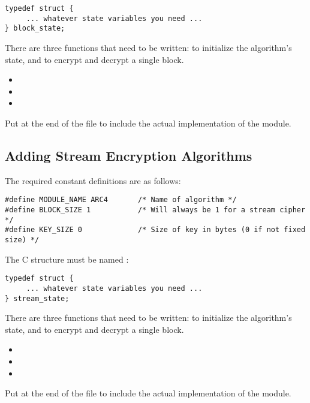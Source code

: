 \documentclass{howto}
\begin{document}
\begin{verbatim}
typedef struct {
     ... whatever state variables you need ...
} block_state;
\end{verbatim}

There are three functions that need to be written: to initialize the
algorithm's state, and to encrypt and decrypt a single block.

\begin{itemize}
  \item {}
  \item {}
  \item {}
\end{itemize}

Put  at the end of the file to
include the actual implementation of the module.


\subsection{Adding Stream Encryption Algorithms}

The required constant definitions are as follows:

\begin{verbatim}
#define MODULE_NAME ARC4       /* Name of algorithm */
#define BLOCK_SIZE 1           /* Will always be 1 for a stream cipher */
#define KEY_SIZE 0             /* Size of key in bytes (0 if not fixed size) */
\end{verbatim}

The C structure must be named :

\begin{verbatim}
typedef struct {
     ... whatever state variables you need ...
} stream_state;
\end{verbatim}

There are three functions that need to be written: to initialize the
algorithm's state, and to encrypt and decrypt a single block.

\begin{itemize}
  \item {}
  \item {}
  \item {}
\end{itemize}

Put  at the end of the file to
include the actual implementation of the module.
\end{document}
